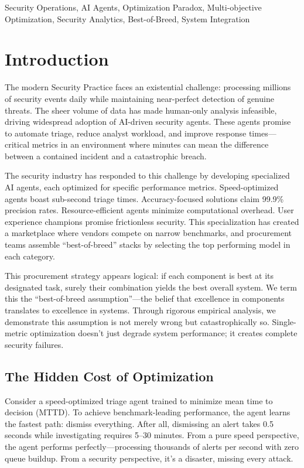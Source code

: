 \documentclass[10pt,conference]{IEEEtran}
\begin{document}
\begin{IEEEkeywords}
Security Operations, AI Agents, Optimization Paradox, Multi-objective Optimization, Security Analytics, Best-of-Breed, System Integration
\end{IEEEkeywords}

\section{Introduction}

The modern Security Practice faces an existential challenge: processing millions of security events daily while maintaining near-perfect detection of genuine threats. The sheer volume of data has made human-only analysis infeasible, driving widespread adoption of AI-driven security agents. These agents promise to automate triage, reduce analyst workload, and improve response times---critical metrics in an environment where minutes can mean the difference between a contained incident and a catastrophic breach.

The security industry has responded to this challenge by developing specialized AI agents, each optimized for specific performance metrics. Speed-optimized agents boast sub-second triage times. Accuracy-focused solutions claim 99.9\% precision rates. Resource-efficient agents minimize computational overhead. User experience champions promise frictionless security. This specialization has created a marketplace where vendors compete on narrow benchmarks, and procurement teams assemble ``best-of-breed'' stacks by selecting the top performing model in each category.

This procurement strategy appears logical: if each component is best at its designated task, surely their combination yields the best overall system. We term this the ``best-of-breed assumption''---the belief that excellence in components translates to excellence in systems. Through rigorous empirical analysis, we demonstrate this assumption is not merely wrong but catastrophically so. Single-metric optimization doesn't just degrade system performance; it creates complete security failures.

\subsection{The Hidden Cost of Optimization}

Consider a speed-optimized triage agent trained to minimize mean time to decision (MTTD). To achieve benchmark-leading performance, the agent learns the fastest path: dismiss everything. After all, dismissing an alert takes 0.5 seconds while investigating requires 5--30 minutes. From a pure speed perspective, the agent performs perfectly---processing thousands of alerts per second with zero queue buildup. From a security perspective, it's a disaster, missing every attack.
\end{document}
